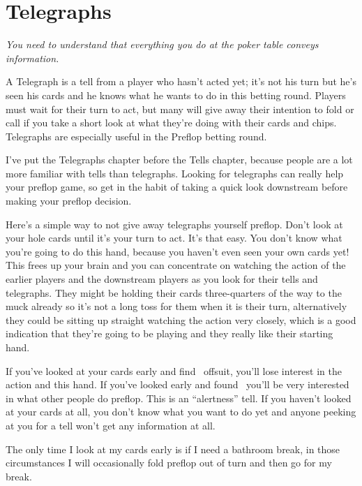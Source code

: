 \chapter{Telegraphs}


\textit{You need to understand that everything you do at the poker
table conveys information.}

A Telegraph is a tell from a player who hasn't acted yet; it's not his
turn but he's seen his cards and he knows what he wants to do in this
betting round. Players must wait for their turn to act, but many will
give away their intention to fold or call if you take a short look at
what they're doing with their cards and chips. Telegraphs are
especially useful in the Preflop betting round.

I've put the Telegraphs chapter before the Tells chapter,
because people are a lot more familiar with tells than
telegraphs. Looking for telegraphs can really help your preflop game,
so get in the habit of taking a quick look downstream before
making your preflop decision.

Here's a simple way to not give away telegraphs yourself preflop.
Don't look at your hole cards until it's your turn to act. It's that easy.
You don't know what you're going to do this hand, because
you haven't even seen your own cards yet! This frees up your brain
and you can concentrate on watching the action of the earlier players
and the downstream players as you look for their tells and telegraphs.
They might be holding their cards three-quarters of the way to the
muck already so it's not a long toss for them when it is their
turn, alternatively they could be sitting up straight watching
the action very closely, which is a good indication that they're
going to be playing and they really like their starting hand.

If you've looked at your cards early and find \sevh\trec\ offsuit,
you'll lose interest in the action and this hand. If you've looked
early and found \Ks\Kc\ you'll be very interested in what other people
do preflop. This is an ``alertness'' tell. If you haven't looked at
your cards at all, you don't know what you want to do yet and anyone
peeking at you for a tell won't get any information at all.

The only time I look at my cards early is if I need a bathroom break,
in those circumstances I will occasionally fold preflop out of turn
and then go for my break.

